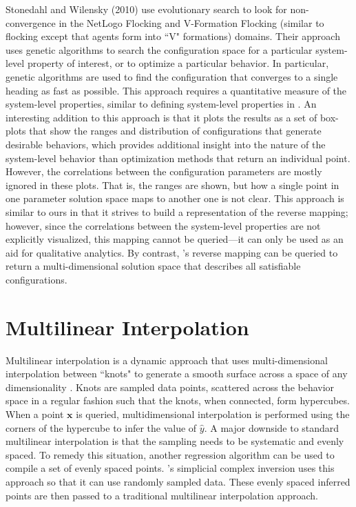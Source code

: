 Stonedahl and Wilensky (2010)\nocite{stonedahl} use evolutionary search to look for non-convergence in the NetLogo Flocking and V-Formation Flocking (similar to flocking except that agents form into ``V" formations) domains.
Their approach uses genetic algorithms to search the configuration space for a particular system-level property of interest, or to optimize a particular behavior.
In particular, genetic algorithms are used to find the configuration that converges to a single heading as fast as possible.
This approach requires a quantitative measure of the system-level properties, similar to defining system-level properties in \fw.
An interesting addition to this approach is that it plots the results as a set of box-plots that show the ranges and distribution of configurations that generate desirable behaviors, which provides additional insight into the nature of the system-level behavior than optimization methods that return an individual point.
However, the correlations between the configuration parameters are mostly ignored in these plots.
That is, the ranges are shown, but how a single point in one parameter solution space maps to another one is not clear.
This approach is similar to ours in that it strives to build a representation of the reverse mapping; however, since the correlations between the system-level properties are not explicitly visualized, this mapping cannot be queried---it can only be used as an aid for qualitative analytics.
By contrast, \fw's reverse mapping can be queried to return a multi-dimensional solution space that describes all satisfiable configurations.


\section{Multilinear Interpolation}
\label{sec:multilinear}

Multilinear interpolation is a dynamic approach that uses multi-dimensional interpolation between ``knots" to generate a smooth surface across a space of any dimensionality \cite{davies1997multidimensional}.
Knots are sampled data points, scattered across the behavior space in a regular fashion such that the knots, when connected, form hypercubes.
When a point $\mathbf x$ is queried, multidimensional interpolation is performed using the corners of the hypercube to infer the value of $\hat y$.
A major downside to standard multilinear interpolation is that the sampling needs to be systematic and evenly spaced.
To remedy this situation, another regression algorithm can be used to compile a set of evenly spaced points.
\fw's simplicial complex inversion uses this approach so that it can use randomly sampled data.
These evenly spaced inferred points are then passed to a traditional multilinear interpolation approach.

